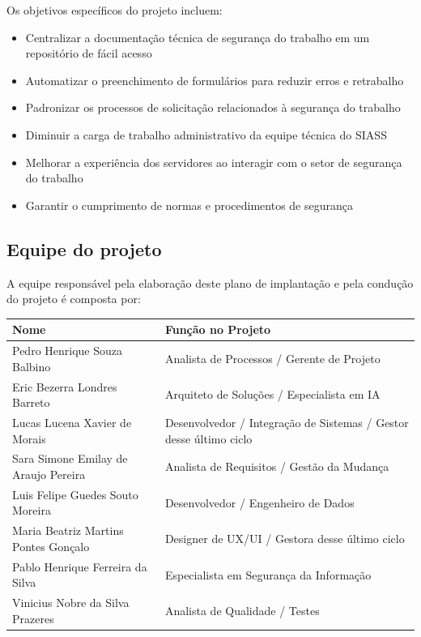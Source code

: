 \documentclass[12pt,a4paper]{article}
\begin{document}
Os objetivos específicos do projeto incluem:

\begin{itemize}
    \item Centralizar a documentação técnica de segurança do trabalho em um repositório de fácil acesso
    \item Automatizar o preenchimento de formulários para reduzir erros e retrabalho
    \item Padronizar os processos de solicitação relacionados à segurança do trabalho
    \item Diminuir a carga de trabalho administrativo da equipe técnica do SIASS
    \item Melhorar a experiência dos servidores ao interagir com o setor de segurança do trabalho
    \item Garantir o cumprimento de normas e procedimentos de segurança
\end{itemize}

\subsection{Equipe do projeto}
A equipe responsável pela elaboração deste plano de implantação e pela condução do projeto é composta por:

\begin{table}[htbp]
\centering
\begin{tabular}{|p{5cm}|p{8cm}|}
\hline
\textbf{Nome} & \textbf{Função no Projeto} \\
\hline
Pedro Henrique Souza Balbino & Analista de Processos / Gerente de Projeto \\
\hline
Eric Bezerra Londres Barreto & Arquiteto de Soluções / Especialista em IA \\
\hline
Lucas Lucena Xavier de Morais & Desenvolvedor / Integração de Sistemas / Gestor desse último ciclo \\
\hline
Sara Simone Emilay de Araujo Pereira & Analista de Requisitos / Gestão da Mudança \\
\hline
Luis Felipe Guedes Souto Moreira & Desenvolvedor / Engenheiro de Dados \\
\hline
Maria Beatriz Martins Pontes Gonçalo & Designer de UX/UI / Gestora desse último ciclo \\
\hline
Pablo Henrique Ferreira da Silva & Especialista em Segurança da Informação \\
\hline
Vinicius Nobre da Silva Prazeres & Analista de Qualidade / Testes \\
\hline
\end{tabular}
\end{table}
\end{document}
